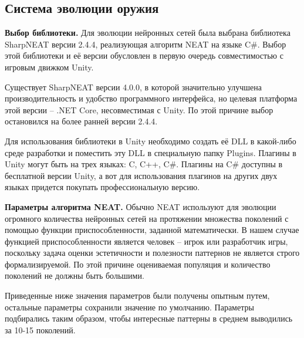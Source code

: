 \subsection{Система эволюции оружия}

\textbf{Выбор библиотеки.} Для эволюции нейронных сетей была выбрана библиотека SharpNEAT\cite{s8} версии 2.4.4, реализующая алгоритм NEAT на языке C\#. Выбор этой библиотеки и её версии обусловлен в первую очередь совместимостью с игровым движком Unity.

Существует SharpNEAT версии 4.0.0, в которой значительно улучшена производительность и удобство программного интерфейса, но целевая платформа этой версии -- .NET Core, несовместимая с Unity. По этой причине выбор остановился на более ранней версии 2.4.4.

Для использования библиотеки в Unity необходимо создать её DLL в какой-либо среде разработки и поместить эту DLL в специальную папку \flqq Plugins\frqq. Плагины в Unity могут быть на трех языках: C, C++, C\#. Плагины на C\# доступны в бесплатной версии Unity, а вот для использования плагинов на других двух языках придется покупать профессиональную версию.




\textbf{Параметры алгоритма NEAT.} Обычно NEAT используют для эволюции огромного количества нейронных сетей на протяжении множества поколений с помощью функции приспособленности, заданной математически. В нашем случае функцией приспособленности является человек -- игрок или разработчик игры, поскольку задача оценки эстетичности и полезности паттернов не является строго формализируемой. По этой причине оцениваемая популяция и количество поколений не должны быть большими.

Приведенные ниже значения параметров были получены опытным путем, остальные параметры сохранили значение по умолчанию. Параметры подбирались таким образом, чтобы интересные паттерны в среднем выводились за 10-15 поколений.


